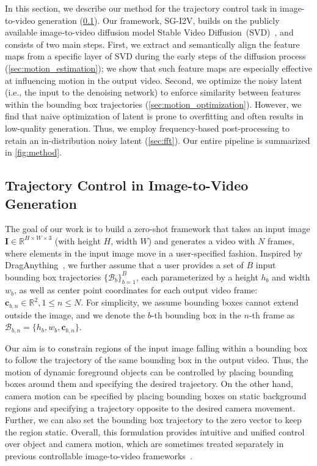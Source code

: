 \documentclass{article} \usepackage{iclr2025_conference,times}
\begin{document}
In this section, we describe our method for the trajectory control task in image-to-video generation (\cref{sec:3_task}).
Our framework, SG-I2V, builds on the publicly available image-to-video diffusion model Stable Video Diffusion~(SVD)~\citep{blattmann2023stable},
and consists of two main steps. 
First, we extract and semantically align the feature maps from a specific layer of SVD during the early steps of the diffusion process (\cref{sec:motion_estimation}); we show that such feature maps are especially effective at influencing motion in the output video.
Second, we optimize the noisy latent (i.e., the input to the denoising network) to enforce similarity between features within the bounding box trajectories (\cref{sec:motion_optimization}).
However, we find that naive optimization of latent is prone to overfitting and often results in low-quality generation.
Thus, we employ frequency-based post-processing to retain an in-distribution noisy latent (\cref{sec:fft}).
Our entire pipeline is summarized in \cref{fig:method}.

\subsection{Trajectory Control in Image-to-Video Generation} \label{sec:3_task}
The goal of our work is to build a zero-shot framework that takes an input image $\mathbf{I} \in \mathbb{R}^{H \times W \times 3}$ (with height $H$, width $W$) and generates a video with $N$ frames, where elements in the input image move in a user-specified fashion.
Inspired by DragAnything~\citep{wu2024draganything}, we further assume that a user provides a set of $B$ input bounding box trajectories $\{\mathcal{B}_b\}_{b=1}^B$, each parameterized by a height $h_b$ and width $w_b$, as well as center point coordinates  for each output video frame: $\mathbf{c}_{b, n}\in\mathbb{R}^2, 1\leq n \leq N$.
For simplicity, we assume bounding boxes cannot extend outside the image, and we denote the $b$-th bounding box in the $n$-th frame as $\mathcal{B}_{b, n} = \{h_b, w_b, \mathbf{c}_{b,n}\}$. 

Our aim is to constrain regions of the input image falling within a bounding box to follow the trajectory of the same bounding box in the output video.
Thus, the motion of dynamic foreground objects can be controlled by placing bounding boxes around them and specifying the desired trajectory.
On the other hand, camera motion can be specified by placing bounding boxes on static background regions and specifying a trajectory opposite to the desired camera movement. Further, we can also set the bounding box trajectory to the zero vector to keep the region static.
Overall, this formulation provides intuitive and unified control over object and camera motion, which are sometimes treated separately in previous controllable image-to-video frameworks~\citep{MotionCtrl, DirectAVideo, li2024image}.
\end{document}
